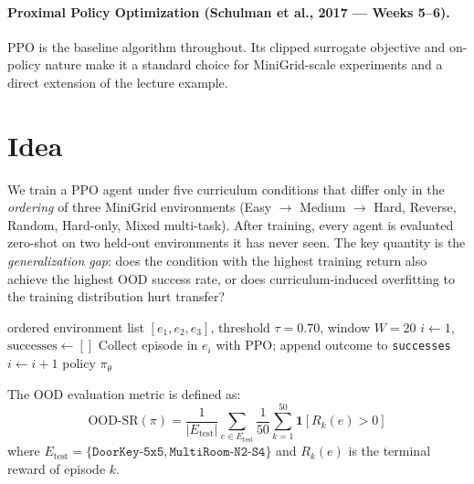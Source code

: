 \documentclass{article}
\begin{document}
\paragraph{Proximal Policy Optimization (Schulman et al., 2017 --- Weeks 5--6).}
PPO is the baseline algorithm throughout. Its clipped surrogate objective and on-policy nature make it a standard choice for MiniGrid-scale experiments and a direct extension of the lecture example.

\section{Idea}

We train a PPO agent under five curriculum conditions that differ only in the \emph{ordering} of three MiniGrid environments (Easy $\to$ Medium $\to$ Hard, Reverse, Random, Hard-only, Mixed multi-task).
After training, every agent is evaluated zero-shot on two held-out environments it has never seen.
The key quantity is the \emph{generalization gap}: does the condition with the highest training return also achieve the highest OOD success rate, or does curriculum-induced overfitting to the training distribution hurt transfer?

\begin{algorithm}[H]
    \caption{Threshold-based curriculum switching for Progressive and Reverse conditions.}
    \label{alg:curriculum}
    \begin{algorithmic}
        \REQUIRE ordered environment list $[e_1, e_2, e_3]$, threshold $\tau = 0.70$, window $W = 20$
        \STATE $i \leftarrow 1$, $\text{successes} \leftarrow []$
            \STATE Collect episode in $e_i$ with PPO; append outcome to \texttt{successes}
                \STATE $i \leftarrow i + 1$ 
            \ENDIF
        \ENDWHILE
        \RETURN policy $\pi_\theta$
    \end{algorithmic}
\end{algorithm}

The OOD evaluation metric is defined as:
\begin{equation}
    \label{eq:ood}
    \text{OOD-SR}(\pi) = \frac{1}{|E_\text{test}|} \sum_{e \in E_\text{test}}
    \frac{1}{50} \sum_{k=1}^{50} \mathbf{1}[R_k(e) > 0]
\end{equation}
where $E_\text{test} = \{\texttt{DoorKey-5x5}, \texttt{MultiRoom-N2-S4}\}$ and $R_k(e)$ is the terminal reward of episode $k$.
\end{document}
